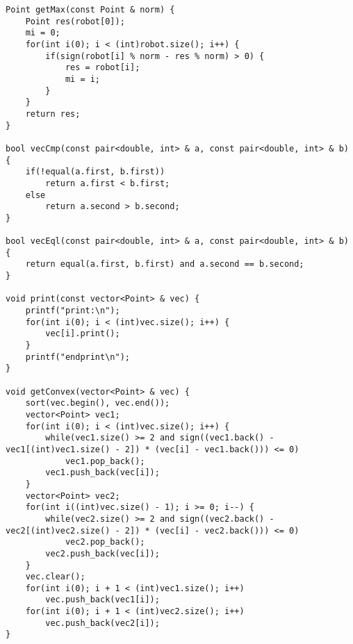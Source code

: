 \begin{lstlisting}
Point getMax(const Point & norm) {
	Point res(robot[0]);
	mi = 0;
	for(int i(0); i < (int)robot.size(); i++) {
		if(sign(robot[i] % norm - res % norm) > 0) {
			res = robot[i];
			mi = i;
		}
	}
	return res;
}

bool vecCmp(const pair<double, int> & a, const pair<double, int> & b) {
	if(!equal(a.first, b.first))
		return a.first < b.first;
	else
		return a.second > b.second;
}

bool vecEql(const pair<double, int> & a, const pair<double, int> & b) {
	return equal(a.first, b.first) and a.second == b.second;
}

void print(const vector<Point> & vec) {
	printf("print:\n");
	for(int i(0); i < (int)vec.size(); i++) {
		vec[i].print();
	}
	printf("endprint\n");
}

void getConvex(vector<Point> & vec) {
	sort(vec.begin(), vec.end());
	vector<Point> vec1;
	for(int i(0); i < (int)vec.size(); i++) {
		while(vec1.size() >= 2 and sign((vec1.back() - vec1[(int)vec1.size() - 2]) * (vec[i] - vec1.back())) <= 0)
			vec1.pop_back();
		vec1.push_back(vec[i]);
	}
	vector<Point> vec2;
	for(int i((int)vec.size() - 1); i >= 0; i--) {
		while(vec2.size() >= 2 and sign((vec2.back() - vec2[(int)vec2.size() - 2]) * (vec[i] - vec2.back())) <= 0)
			vec2.pop_back();
		vec2.push_back(vec[i]);
	}
	vec.clear();
	for(int i(0); i + 1 < (int)vec1.size(); i++)
		vec.push_back(vec1[i]);
	for(int i(0); i + 1 < (int)vec2.size(); i++)
		vec.push_back(vec2[i]);
}


\end{lstlisting}
